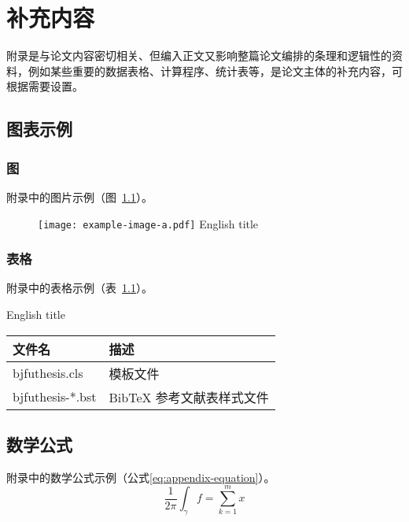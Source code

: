 
\chapter{补充内容}

附录是与论文内容密切相关、但编入正文又影响整篇论文编排的条理和逻辑性的资料，例如某些重要的数据表格、计算程序、统计表等，是论文主体的补充内容，可根据需要设置。


\section{图表示例}

\subsection{图}

附录中的图片示例（图~\ref{fig:appendix-figure}）。

\begin{figure}[h]
  \centering
  \texttt{[image: example-image-a.pdf]}
   {English title}
  \label{fig:appendix-figure}
\end{figure}


\subsection{表格}

附录中的表格示例（表~\ref{tab:appendix-table}）。

\begin{table}[h]
  \centering
   {English title}
  \begin{tabular}{ll}
    \toprule
    文件名          & 描述                         \\
    \midrule
    bjfuthesis.cls   & 模板文件                     \\
    bjfuthesis-*.bst & BibTeX 参考文献表样式文件    \\
    \bottomrule
  \end{tabular}
  \label{tab:appendix-table}
\end{table}


\section{数学公式}

附录中的数学公式示例（公式\eqref{eq:appendix-equation}）。
\begin{equation}
  \frac{1}{2 \pi} \int_\gamma f = \sum_{k=1}^m  x
  \label{eq:appendix-equation}
\end{equation}
